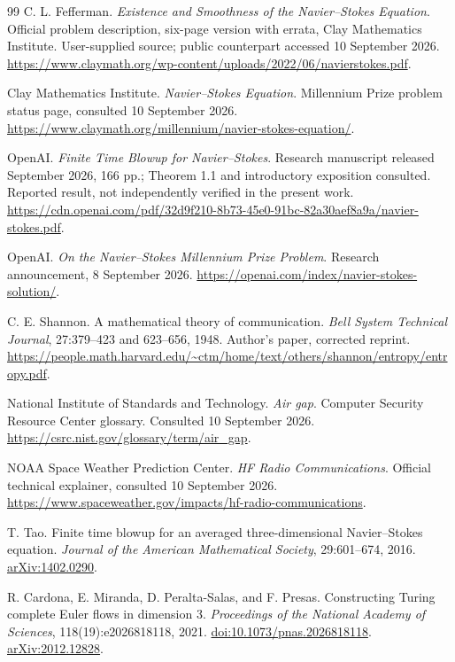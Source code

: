 \begin{thebibliography}{99}
C. L. Fefferman. \emph{Existence and Smoothness of the Navier--Stokes Equation}. Official problem description, six-page version with errata, Clay Mathematics Institute. User-supplied source; public counterpart accessed 10 September 2026. \url{https://www.claymath.org/wp-content/uploads/2022/06/navierstokes.pdf}.

Clay Mathematics Institute. \emph{Navier--Stokes Equation}. Millennium Prize problem status page, consulted 10 September 2026. \url{https://www.claymath.org/millennium/navier-stokes-equation/}.

OpenAI. \emph{Finite Time Blowup for Navier--Stokes}. Research manuscript released September 2026, 166 pp.; Theorem 1.1 and introductory exposition consulted. Reported result, not independently verified in the present work. \url{https://cdn.openai.com/pdf/32d9f210-8b73-45e0-91bc-82a30aef8a9a/navier-stokes.pdf}.

OpenAI. \emph{On the Navier--Stokes Millennium Prize Problem}. Research announcement, 8 September 2026. \url{https://openai.com/index/navier-stokes-solution/}.

C. E. Shannon. A mathematical theory of communication. \emph{Bell System Technical Journal}, 27:379--423 and 623--656, 1948. Author's paper, corrected reprint. \url{https://people.math.harvard.edu/~ctm/home/text/others/shannon/entropy/entropy.pdf}.

National Institute of Standards and Technology. \emph{Air gap}. Computer Security Resource Center glossary. Consulted 10 September 2026. \url{https://csrc.nist.gov/glossary/term/air_gap}.

NOAA Space Weather Prediction Center. \emph{HF Radio Communications}. Official technical explainer, consulted 10 September 2026. \url{https://www.spaceweather.gov/impacts/hf-radio-communications}.

T. Tao. Finite time blowup for an averaged three-dimensional Navier--Stokes equation. \emph{Journal of the American Mathematical Society}, 29:601--674, 2016. \href{https://arxiv.org/abs/1402.0290}{arXiv:1402.0290}.

R. Cardona, E. Miranda, D. Peralta-Salas, and F. Presas. Constructing Turing complete Euler flows in dimension 3. \emph{Proceedings of the National Academy of Sciences}, 118(19):e2026818118, 2021. \href{https://doi.org/10.1073/pnas.2026818118}{doi:10.1073/pnas.2026818118}. \href{https://arxiv.org/abs/2012.12828}{arXiv:2012.12828}.


\end{thebibliography}
